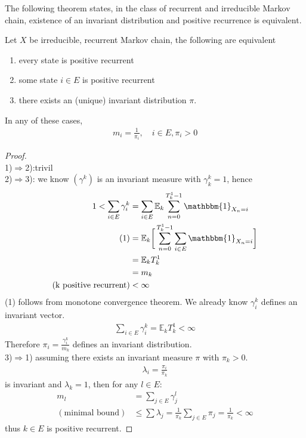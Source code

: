 The following theorem states, in the class of recurrent and irreducible Markov chain, existence of an invariant distribution and positive recurrence is equivalent.
\begin{theorem}
	Let $X$ be irreducible, recurrent Markov chain, the following are equivalent
	\begin{enumerate}
		\item every state is positive recurrent
		\item some state $i \in E$ is positive recurrent
		\item there exists an (unique) invariant distribution  $\pi$.
	\end{enumerate}
	In any of these cases, 
	\begin{align*}
		m_i = \frac{1}{\pi_i}, \quad i \in E, \pi_i > 0
	\end{align*}
\end{theorem}
\begin{proof}\quad\\
1)$\Rightarrow$2):trivil\\
2)$\Rightarrow$3): we know $(\gamma^k)$ is an invariant measure with $\gamma_k^k = 1$, hence
\begin{align*}
	1 < \sum_{i \in E} \gamma_i^k &= \sum_{i \in E}\mathbb{E}_k \sum_{n = 0}^{T_k^1 -1}\mathbbm{1}_{X_n = i}\\
	(1)
	&= \mathbb{E}_k \bigg[ \sum_{n = 0}^{T_k^1 -1} \sum_{i \in E} \mathbbm{1}_{X_n = i} \bigg]\\
	&= \mathbb{E}_k T_k^1\\
	&= m_k \\
(\text{k positive recurrent})
	&< \infty
\end{align*}
(1) follows from monotone convergence theorem. We already know $\gamma^k_i$ defines an invariant vector.
\begin{align*}
	\sum_{i \in E}\gamma_i^k = \mathbb{E}_k T^1_k < \infty
\end{align*}
Therefore $\pi_i = \frac{\gamma_i^k}{m_k}$ defines an invariant distribution.\\
3)$\Rightarrow$1) assuming there exists an invariant measure $\pi$ with $\pi_k >0$. 
\begin{align*}
	\lambda_i = \frac{\pi_i}{\pi_k}
\end{align*}
is invariant and $\lambda_k = 1$, then for any $l \in E$:
\begin{align*}
	m_l &= \sum_{j \in E} \gamma_j^l \\
	(\text{minimal bound})
	&\le \sum \lambda_j = \frac{1}{\pi_k} \sum_{j \in E} \pi_j = \frac{1}{\pi_k} < \infty
\end{align*}
thus $k \in E$ is positive recurrent.
	
\end{proof}

